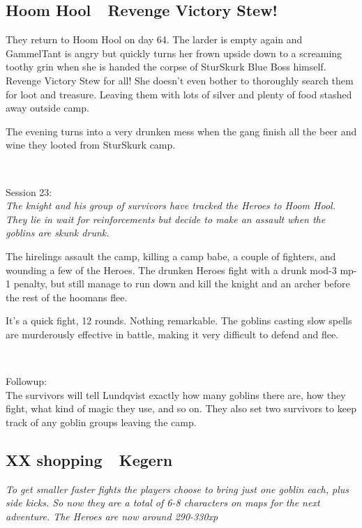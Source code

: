 \subsection*{Hoom Hool~\mdash~Revenge Victory Stew!}

They return to Hoom Hool on day 64. The larder is empty again and GammelTant is angry but quickly turns her frown upside down to a screaming toothy grin when she is handed the corpse of SturSkurk Blue Boss himself. Revenge Victory Stew for all! She doesn't even bother to thoroughly search them for loot and treasure. Leaving them with lots of silver and plenty of food stashed away outside camp.

The evening turns into a very drunken mess when the gang finish all the beer and wine they looted from SturSkurk camp.

\

\noindent Session 23:\\                                                 %
\textit{The knight and his group of survivors have tracked the Heroes to Hoom Hool. They lie in wait for reinforcements but decide to make an assault when the goblins are skunk drunk.}

The hirelings assault the camp, killing a camp babe, a couple of fighters, and wounding a few of the Heroes. The drunken Heroes fight with a drunk mod-3 mp-1 penalty, but still manage to run down and kill the knight and an archer before the rest of the hoomans flee. 

It's a quick fight, 12 rounds. Nothing remarkable. The goblins casting slow spells are murderously effective in battle, making it very difficult to defend and flee.

\

Followup:\\
The survivors will tell Lundqvist exactly how many goblins there are, how they fight, what kind of magic they use, and so on. They also set two survivors to keep track of any goblin groups leaving the camp.


\subsection*{XX shopping~\mdash~Kegern}

\textit{To get smaller faster fights the players choose to bring just one goblin each, plus side kicks. So now they are a total of 6-8 characters on maps for the next adventure. The Heroes are now around 290-330xp}

\

